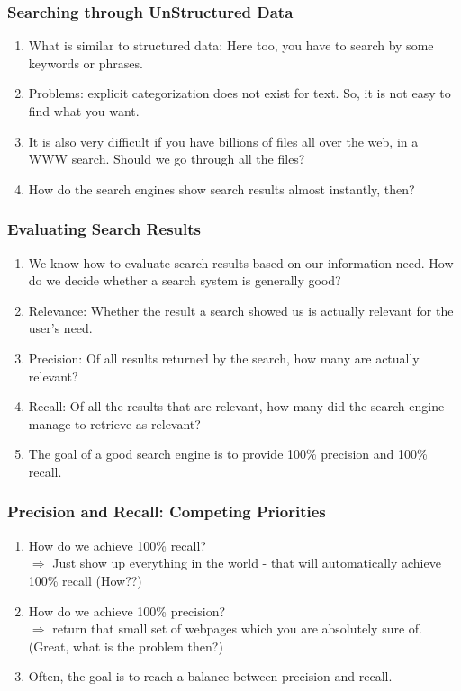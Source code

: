 \documentclass{beamer}
\begin{document}
\begin{frame}
\frametitle{Searching through UnStructured Data}%
\begin{enumerate}
\item What is similar to structured data: Here too, you have to search by some keywords or phrases. 
\item Problems: explicit categorization does not exist for text. So, it is not easy to find what you want. \pause
\item It is also very difficult if you have billions of files all over the web, in a WWW search. Should we go through all the files?
\item How do the search engines show search results almost instantly, then?
\end{enumerate}
\end{frame}

\begin{frame}
\frametitle{Evaluating Search Results}%
\begin{enumerate}
\item We know how to evaluate search results based on our information need. How do we decide whether a search system is generally good? \pause
\item Relevance: Whether the result a search showed us is actually relevant for the user's need. \pause
\item Precision: Of all results returned by the search, how many are actually relevant?
\item Recall: Of all the results that are relevant, how many did the search engine manage to retrieve as relevant? 
\item The goal of a good search engine is to provide 100\% precision and 100\% recall. 
\end{enumerate}
\end{frame}

\begin{frame}
\frametitle{Precision and Recall: Competing Priorities}%
\begin{enumerate}
\item How do we achieve 100\% recall? \pause
\\ $\Rightarrow$ Just show up everything in the world - that will automatically achieve 100\% recall (How??) \pause
\item How do we achieve 100\% precision? \pause
\\ $\Rightarrow$ return that small set of webpages which you are absolutely sure of. (Great, what is the problem then?) \pause
\item Often, the goal is to reach a balance between precision and recall. 
\end{enumerate}
\end{frame}
\end{document}
